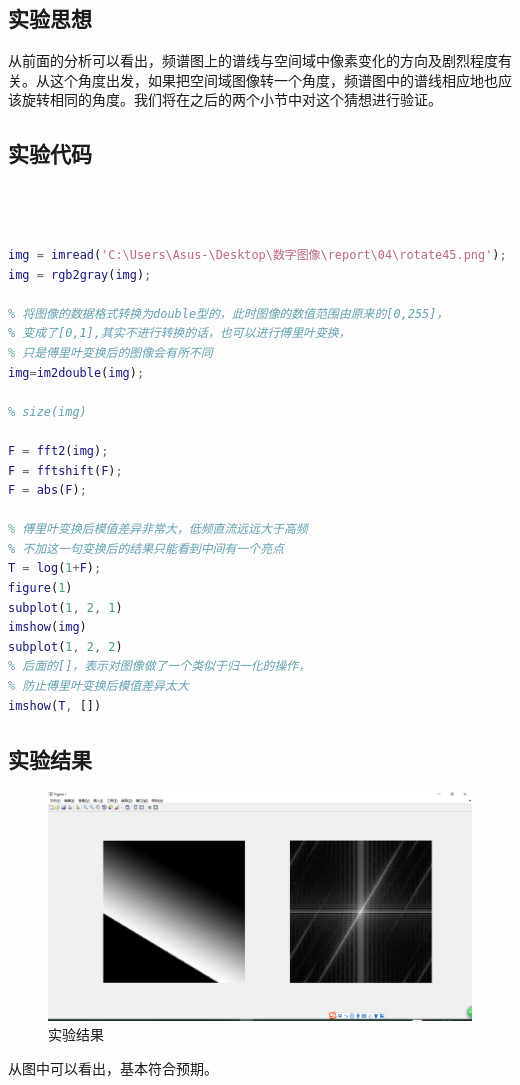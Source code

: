 \documentclass[UTF8]{ctexart}
\begin{document}
        \subsection{实验思想}
            \indent 从前面的分析可以看出，频谱图上的谱线与空间域中像素变化的方向及剧烈程度有关。从这个角度出发，如果把空间域图像转一个角度，频谱图中的谱线相应地也应该旋转相同的角度。我们将在之后的两个小节中对这个猜想进行验证。
        \subsection{实验代码}
            	\begin{lstlisting}[language=Matlab,caption={实验代码},label={broadcast.cpp}]
% reference: https://blog.csdn.net/jiugedexiaodi/article/details/79705308



img = imread('C:\Users\Asus-\Desktop\数字图像\report\04\rotate45.png');
img = rgb2gray(img);

% 将图像的数据格式转换为double型的，此时图像的数值范围由原来的[0,255]，
% 变成了[0,1],其实不进行转换的话，也可以进行傅里叶变换，
% 只是傅里叶变换后的图像会有所不同
img=im2double(img);

% size(img)

F = fft2(img);
F = fftshift(F);
F = abs(F);

% 傅里叶变换后模值差异非常大，低频直流远远大于高频
% 不加这一句变换后的结果只能看到中间有一个亮点
T = log(1+F);
figure(1)
subplot(1, 2, 1)
imshow(img)
subplot(1, 2, 2)
% 后面的[]，表示对图像做了一个类似于归一化的操作，
% 防止傅里叶变换后模值差异太大
imshow(T, [])
            	\end{lstlisting}
                
                
        \subsection{实验结果}
        
            \begin{figure}[htbp]
            	\centering 
                \includegraphics[scale=0.4]{result.png} 
            	\caption{实验结果} 
            	\label{result}
            \end{figure}
            \indent 从图中可以看出，基本符合预期。
            
\end{document}
